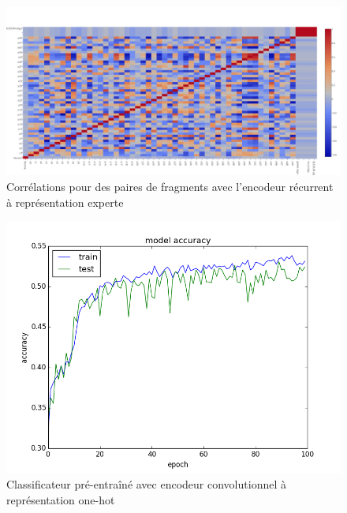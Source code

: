 \documentclass[a4paper, 11pt, onecolumn]{article}
\begin{document}
\begin{figure}[H]
  \centering
    \includegraphics[width=1\textwidth]{PairEmbedRecHeat}
    \caption{Corrélations pour des paires de fragments avec l'encodeur récurrent
      à représentation experte}
\end{figure}

\begin{figure}[H]
  \centering
  \includegraphics[width=1.1\textwidth]{ConvClass}
  \caption{Classificateur pré-entraîné avec encodeur
    convolutionnel à représentation one-hot}
\end{figure}
\end{document}
